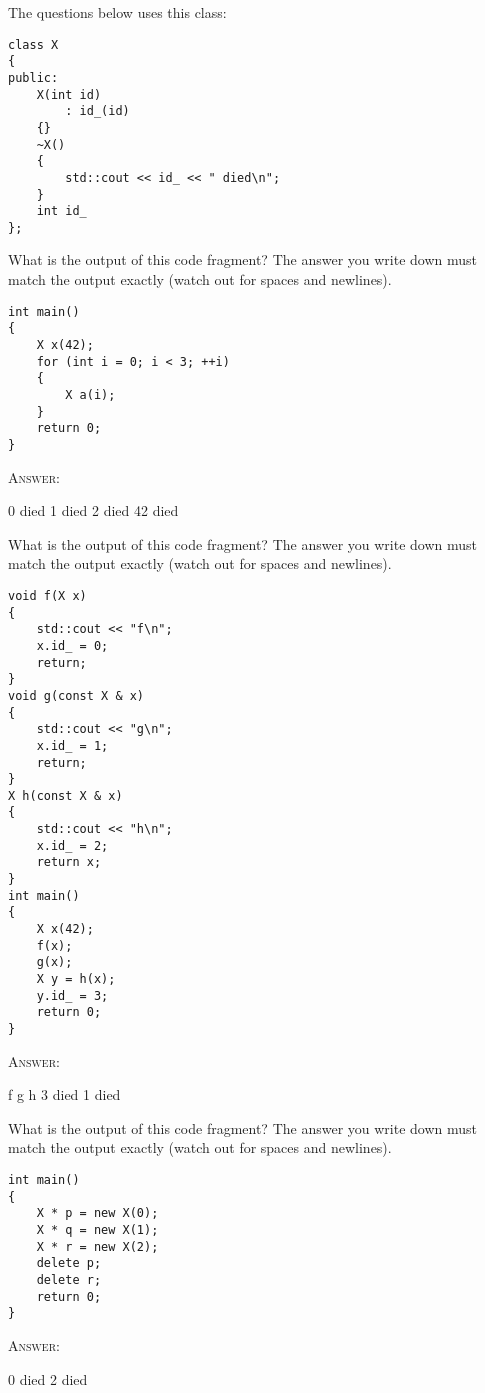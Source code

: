 

\renewcommand\AUTHOR{cadalebout1@cougars.ccis.edu} %


\topmattertwo

The questions below uses this class: 
\begin{Verbatim}[frame=single,fontsize=\footnotesize]
class X
{
public:
    X(int id)
        : id_(id)
    {}
    ~X()
    {
        std::cout << id_ << " died\n";
    }
    int id_
};
\end{Verbatim}

\nextq
What is the output of this code fragment?
The answer you write down must match the output exactly (watch out for
spaces and newlines).
\begin{Verbatim}[frame=single,fontsize=\footnotesize]
int main()
{
    X x(42);
    for (int i = 0; i < 3; ++i)
    {
        X a(i);
    }
    return 0;
}
\end{Verbatim}
\textsc{Answer:}\vspace{-2mm}
\begin{answercode}
0 died
1 died
2 died
42 died
\end{answercode}

\nextq
What is the output of this code fragment?
The answer you write down must match the output exactly (watch out for
spaces and newlines).
\begin{Verbatim}[frame=single,fontsize=\footnotesize]
void f(X x)
{
    std::cout << "f\n";
    x.id_ = 0;
    return;
}
void g(const X & x)
{
    std::cout << "g\n";
    x.id_ = 1;
    return;
}
X h(const X & x)
{
    std::cout << "h\n";
    x.id_ = 2;
    return x;
}
int main()
{
    X x(42);
    f(x);
    g(x);
    X y = h(x);
    y.id_ = 3;
    return 0;
}
\end{Verbatim}
\textsc{Answer:}\vspace{-2mm}
\begin{answercode}
f
g
h
3 died
1 died
\end{answercode}


\nextq
What is the output of this code fragment?
The answer you write down must match the output exactly (watch out for
spaces and newlines).
\begin{Verbatim}[frame=single,fontsize=\footnotesize]
int main()
{
    X * p = new X(0);
    X * q = new X(1);
    X * r = new X(2);
    delete p;
    delete r;
    return 0;
}
\end{Verbatim}
\textsc{Answer:}\vspace{-2mm}
\begin{answercode}
0 died
2 died
\end{answercode}

\newpage


